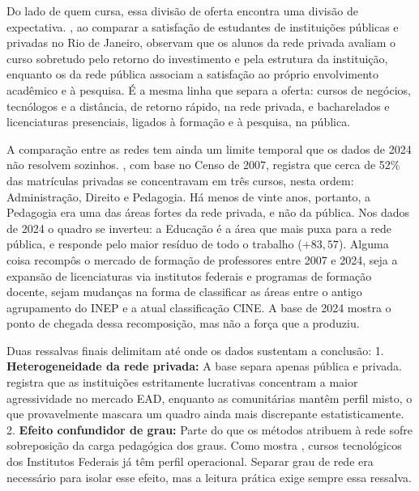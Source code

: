 \documentclass[12pt]{article}
\begin{document}
Do lado de quem cursa, essa divisão de oferta encontra uma divisão de expectativa. \textcite{benevidessoares2023satisfacao}, ao comparar a satisfação de estudantes de instituições públicas e privadas no Rio de Janeiro, observam que os alunos da rede privada avaliam o curso sobretudo pelo retorno do investimento e pela estrutura da instituição, enquanto os da rede pública associam a satisfação ao próprio envolvimento acadêmico e à pesquisa. É a mesma linha que separa a oferta: cursos de negócios, tecnólogos e a distância, de retorno rápido, na rede privada, e bacharelados e licenciaturas presenciais, ligados à formação e à pesquisa, na pública.

A comparação entre as redes tem ainda um limite temporal que os dados de 2024 não resolvem sozinhos. \textcite{alonsoExpansaoEnsinoSuperior2010}, com base no Censo de 2007, registra que cerca de 52\% das matrículas privadas se concentravam em três cursos, nesta ordem: Administração, Direito e Pedagogia. Há menos de vinte anos, portanto, a Pedagogia era uma das áreas fortes da rede privada, e não da pública. Nos dados de 2024 o quadro se inverteu: a Educação é a área que mais puxa para a rede pública, e responde pelo maior resíduo de todo o trabalho ($+83{,}57$). Alguma coisa recompôs o mercado de formação de professores entre 2007 e 2024, seja a expansão de licenciaturas via institutos federais e programas de formação docente, sejam mudanças na forma de classificar as áreas entre o antigo agrupamento do INEP e a atual classificação CINE. A base de 2024 mostra o ponto de chegada dessa recomposição, mas não a força que a produziu.

Duas ressalvas finais delimitam até onde os dados sustentam a conclusão:
1. \textbf{Heterogeneidade da rede privada:} A base separa apenas pública e privada. \textcite{carvalhoMercantilizacaoEducacaoSuperior2013} registra que as instituições estritamente lucrativas concentram a maior agressividade no mercado EAD, enquanto as comunitárias mantêm perfil misto, o que provavelmente mascara um quadro ainda mais discrepante estatisticamente.
2. \textbf{Efeito confundidor de grau:} Parte do que os métodos atribuem à rede sofre sobreposição da carga pedagógica dos graus. Como mostra \textcite{motaEDUCACAOSUPERIOREM2012}, cursos tecnológicos dos Institutos Federais já têm perfil operacional. Separar grau de rede era necessário para isolar esse efeito, mas a leitura prática exige sempre essa ressalva.

\end{document}
